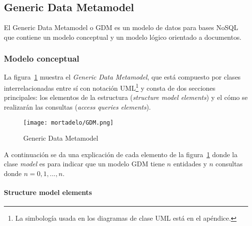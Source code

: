 \subsection{Generic Data Metamodel}
El Generic Data Metamodel o GDM es un modelo de datos para bases NoSQL que contiene un modelo conceptual y un modelo lógico orientado a documentos.
\subsubsection{Modelo conceptual}

La figura~\ref{img:mortadelo-gdm} muestra el \textit{Generic Data Metamodel}, que está compuesto por clases interrelacionadas entre sí con notación UML\footnote{La simbología usada en los diagramas de clase UML está en el apéndice.} y consta de dos secciones principales: los elementos de la estructura (\textit{structure model elements}) y el cómo se realizarán las consultas (\textit{access queries elements}).




\begin{figure}[H] 
    \centering
    \texttt{[image: mortadelo/GDM.png]}
    \caption{Generic Data Metamodel}
    \label{img:mortadelo-gdm}
\end{figure}


A continuación se da una explicación de cada elemento de la figura~\ref{img:mortadelo-gdm} donde la clase \textit{model} es para indicar que un modelo GDM tiene $n$ entidades y $n$ consultas donde $n=0,1,...,n$.


\paragraph*{Structure model elements}


